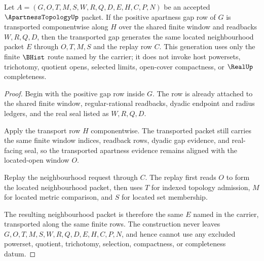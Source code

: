\begin{theorem}
\label{thm:apartnesstopology-neighborhood-apartness-transport}
Let $A=(G,O,T,M,S,W,R,Q,D,E,H,C,P,N)$ be an accepted $\ApartnessTopologyUp$ packet. If the positive apartness gap row of $G$ is transported componentwise along $H$ over the shared finite window and readbacks $W,R,Q,D$, then the transported gap generates the same located neighbourhood packet $E$ through $O,T,M,S$ and the replay row $C$. This generation uses only the finite $\BHist$ route named by the carrier; it does not invoke host powersets, trichotomy, quotient opens, selected limits, open-cover compactness, or $\RealUp$ completeness.
\end{theorem}
\begin{proof}
Begin with the positive gap row inside $G$. The row is already attached to the shared finite window, regular-rational readbacks, dyadic endpoint and radius ledgers, and the real seal listed as $W,R,Q,D$.

Apply the transport row $H$ componentwise. The transported packet still carries the same finite window indices, readback rows, dyadic gap evidence, and real-facing seal, so the transported apartness evidence remains aligned with the located-open window $O$.

Replay the neighbourhood request through $C$. The replay first reads $O$ to form the located neighbourhood packet, then uses $T$ for indexed topology admission, $M$ for located metric comparison, and $S$ for located set membership.

The resulting neighbourhood packet is therefore the same $E$ named in the carrier, transported along the same finite rows. The construction never leaves $G,O,T,M,S,W,R,Q,D,E,H,C,P,N$, and hence cannot use any excluded powerset, quotient, trichotomy, selection, compactness, or completeness datum.
\end{proof}

